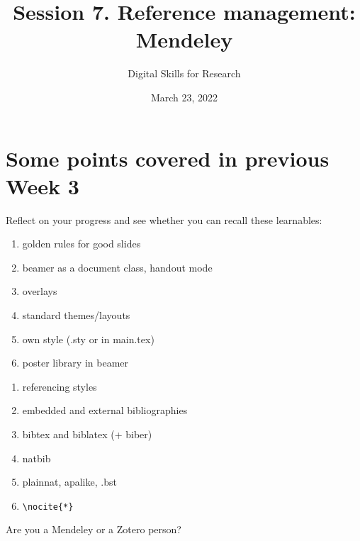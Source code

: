 \documentclass[a4paper,11pt]{article}
\title{Session 7. Reference management: Mendeley}
\author{Digital Skills for Research}
\date{March 23, 2022}
\begin{document}
\maketitle
\tableofcontents

\section*{Some points covered in previous Week 3}

Reflect on your progress and see whether you can recall these learnables:

\bigskip

\begin{tcolorbox}[width=.475\textwidth, nobeforeafter,height=6.5cm,valign=center, fonttitle=\bfseries,title=Session 5]
	\begin{enumerate}
		\item golden rules for good slides %
		\item beamer as a document class, handout mode
		\item overlays
		\item standard themes/layouts
		\item own style (.sty or in main.tex)
		\item poster library in beamer

	\end{enumerate}
\end{tcolorbox}\hfill
%
\begin{tcolorbox}[width=.475\textwidth, nobeforeafter,height=6.5cm,valign=center,fonttitle=\bfseries,title=Session 6]
	\begin{enumerate}
		\item referencing styles
		\item embedded and external bibliographies
		\item bibtex and biblatex (+ biber)
		\item natbib 
		\item plainnat, apalike, .bst
		\item \verb|\nocite{*}|
	\end{enumerate}
\end{tcolorbox}

\bigskip

\begin{tcolorbox}[colback=red!5!white, colframe=red!75!black]
	\centering
	{\Large{Are you a Mendeley or a Zotero person?}}
\end{tcolorbox}
\end{document}

